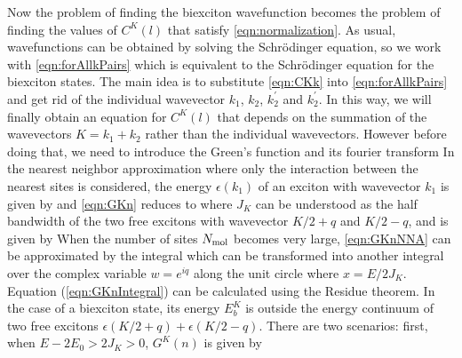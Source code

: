 Now the problem of finding the biexciton wavefunction becomes the problem of finding the values of $C^{K}(l)$ that 
satisfy \autoref{eqn:normalization}. As usual, wavefunctions can be obtained by solving the Schr{\" o}dinger equation, so
 we work with \autoref{eqn:forAllkPairs} which is equivalent to the Schr{\" o}dinger equation for the biexciton states. 
The main idea is to substitute \autoref{eqn:CKk} into \autoref{eqn:forAllkPairs} and get rid of the individual 
wavevector $k_1$, $k_2$, $k_2^{'}$ and $k_2^{'}$. In this way, we will finally obtain an equation for $C^{K}(l)$ that
 depends on the summation of the wavevectors $K = k_1 + k_2$ rather than the individual wavevectors. However 
before doing that, we need to introduce the Green's function
and its fourier transform
In the nearest neighbor approximation where only the interaction between the nearest sites is considered,  the energy $\epsilon(k_1)$ of an exciton with wavevector $k_1$ is given by
and \autoref{eqn:GKn} reduces to
where $J_{K}$ can be understood as the half bandwidth of the two free excitons with wavevector $K/2 + q$ and $K/2-q$,
 and is given by
When the number of sites $N_{\rm mol}$ becomes very large, \autoref{eqn:GKnNNA} can be approximated by the
 integral
which can be transformed into another integral over the complex variable $w=e^{iq}$ along the unit circle
where $x = E/2J_K $. Equation (\ref{eqn:GKnIntegral}) can be calculated using the Residue theorem. In the case of a
 biexciton state, its energy $E^{K}_{b}$ is outside the energy continuum of two free excitons 
$\epsilon(K/2+q) + \epsilon(K/2-q)$. There are  two scenarios:  first, when $E - 2 E_0 > 2 J_K >0$, $G^{K}(n)$ is given by
